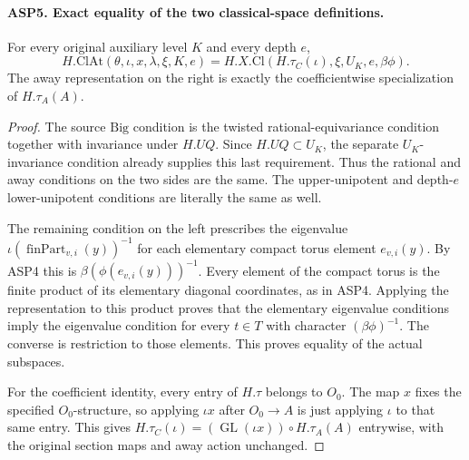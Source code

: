 \documentclass[11pt,a4paper]{article}
\numberwithin{equation}{section}
\theoremstyle{remark}\newtheorem{remark}[theorem]{Remark}
\begin{document}
\paragraph{ASP5. Exact equality of the two classical-space definitions.}
\label{claim:ASP5}
For every original auxiliary level $K$ and every
depth $e$,
\begin{equation}\label{eq:asp-classical}
 H.\mathrm{ClAt}(\theta,\iota,\allowbreak{} x,\lambda,\xi,\allowbreak{} K,\allowbreak{} e)
    =H.X.\mathrm{Cl}(H.\tau_C(\iota),\xi,\allowbreak{} U_K,\allowbreak{} e,\beta\phi).
\end{equation}
The away representation on the right is exactly
the coefficientwise specialization of $H.\tau_A(A)$.
\begin{proof}
The source $\mathrm{Big}$ condition is the
twisted rational-equivariance condition together
with invariance under $H.UQ$.  Since
$H.UQ\subset U_K$, the separate $U_K$-invariance
condition already supplies this last requirement.
Thus the rational and away conditions on the two
sides are the same.  The upper-unipotent and
depth-$e$ lower-unipotent conditions are literally
the same as well.

The remaining condition on the left prescribes
the eigenvalue
$\iota(\operatorname{finPart}_{v,\allowbreak{} i}(y))^{-1}$
for each elementary compact torus element
$e_{v,\allowbreak{} i}(y)$.  By ASP4 this is
$\beta(\phi(e_{v,\allowbreak{} i}(y)))^{-1}$.
Every element of the compact torus is the finite
product of its elementary diagonal coordinates,
as in ASP4.  Applying the representation to this
product proves that the elementary eigenvalue
conditions imply the eigenvalue condition for
every $t\in T$ with character $(\beta\phi)^{-1}$.
The converse is restriction to those elements.
This proves equality of the actual subspaces.

For the coefficient identity, every entry of
$H.\tau$ belongs to $O_0$.  The map $x$ fixes
the specified $O_0$-structure, so applying
$\iota x$ after $O_0\to A$ is just applying
$\iota$ to that same entry.  This gives
$H.\tau_C(\iota)=(\operatorname{GL}(\iota x))
\circ H.\tau_A(A)$ entrywise, with the original
section maps and away action unchanged.
\end{proof}

\end{document}
